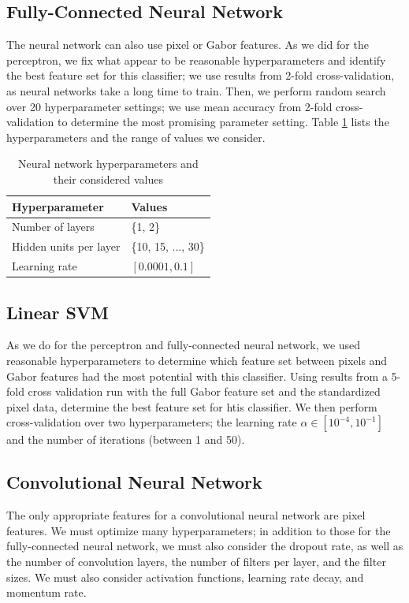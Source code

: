 \documentclass{acm_proc_article-sp}
\begin{document}
\subsection{Fully-Connected Neural Network}
The neural network can also use pixel or Gabor features. As we did for the perceptron, we fix what appear to be reasonable hyperparameters and identify the best feature set for this classifier; we use results from 2-fold cross-validation, as neural networks take a long time to train. Then, we perform random search over 20 hyperparameter settings; we use mean accuracy from 2-fold cross-validation to determine the most promising parameter setting. Table \ref{tab:nn-hyp} lists the hyperparameters and the range of values we consider.
\begin{table}[h!]
  \centering
  \begin{tabular}{|l|l|}
    \hline 
    {\bfseries Hyperparameter} & {\bfseries Values}\\
    \hline \hline
    Number of layers & \{1, 2\} \\
    Hidden units per layer & \{10, 15, ..., 30\} \\
    Learning rate & $[0.0001, 0.1]$ \\
    \hline
  \end{tabular}
  \caption{Neural network hyperparameters and their considered values}
  \label{tab:nn-hyp}
\end{table}


\subsection{Linear SVM}
As we do for the perceptron and fully-connected neural network, we used reasonable hyperparameters to determine which feature set between pixels and Gabor features had the most potential with this classifier. Using results from a 5-fold cross validation run with the full Gabor feature set and the standardized pixel data, determine the best feature set for htis classifier. We then perform cross-validation over two hyperparameters; the learning rate $\alpha \in [10^{-4},10^{-1}]$  and the number of iterations (between 1 and 50). 

\subsection{Convolutional Neural Network}
The only appropriate features for a convolutional neural network are pixel features. We must optimize many hyperparameters; in addition to those for the fully-connected neural network, we must also consider the dropout rate, as well as the number of convolution layers, the number of filters per layer, and the filter sizes. We must also consider activation functions, learning rate decay, and momentum rate. 
\end{document}
